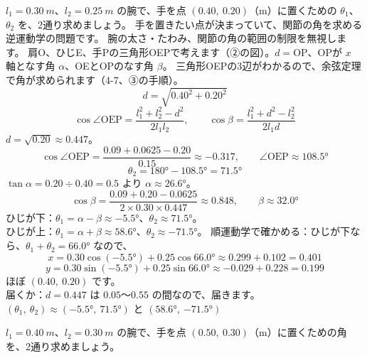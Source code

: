\begin{phreidai}\label{ph:力-7:ex6}
$l_1=\qty{0.30}{m}$、$l_2=\qty{0.25}{m}$ の腕で、手を点 $(0.40,\ 0.20)$（m）に置くための $\theta_1$、$\theta_2$ を、2通り求めましょう。
\phbamen
手を置きたい点が決まっていて、関節の角を求める逆運動学の問題です。
\phmushi
腕の太さ・たわみ、関節の角の範囲の制限を無視します。
\phzu
肩O、ひじE、手Pの三角形OEPで考えます（②の図）。$d=\mathrm{OP}$、OPが $x$ 軸となす角 $\alpha$、OEとOPのなす角 $\beta$。
\phriyu
三角形OEPの3辺がわかるので、余弦定理で角が求められます（4-7、③の手順）。
\phtateru
\[d=\sqrt{0.40^2+0.20^2}\]
\[\cos\angle\mathrm{OEP}=\frac{l_1^2+l_2^2-d^2}{2l_1l_2},\qquad \cos\beta=\frac{l_1^2+d^2-l_2^2}{2l_1d}\]
\phtoku
$d=\sqrt{0.20}\approx0.447$。
\[\cos\angle\mathrm{OEP}=\frac{0.09+0.0625-0.20}{0.15}\approx-0.317,\qquad \angle\mathrm{OEP}\approx\ang{108.5}\]
\[\theta_2=\ang{180}-\ang{108.5}=\ang{71.5}\]
$\tan\alpha=0.20\div0.40=0.5$ より $\alpha\approx\ang{26.6}$。
\[\cos\beta=\frac{0.09+0.20-0.0625}{2\times0.30\times0.447}\approx0.848,\qquad \beta\approx\ang{32.0}\]
ひじが下：$\theta_1=\alpha-\beta\approx\ang{-5.5}$、$\theta_2\approx\ang{71.5}$。\\
ひじが上：$\theta_1=\alpha+\beta\approx\ang{58.6}$、$\theta_2\approx\ang{-71.5}$。
\phtashikame
順運動学で確かめる：ひじが下なら、$\theta_1+\theta_2=\ang{66.0}$ なので、
\[x=0.30\cos(\ang{-5.5})+0.25\cos\ang{66.0}\approx0.299+0.102=0.401\]
\[y=0.30\sin(\ang{-5.5})+0.25\sin\ang{66.0}\approx-0.029+0.228=0.199\]
ほぼ $(0.40,\ 0.20)$ です。\\
届くか：$d=0.447$ は $0.05$〜$0.55$ の間なので、届きます。
\kotae $(\theta_1,\ \theta_2)\approx(\ang{-5.5},\ \ang{71.5})$ と $(\ang{58.6},\ \ang{-71.5})$
\end{phreidai}
\begin{jibun}
$l_1=\qty{0.40}{m}$、$l_2=\qty{0.30}{m}$ の腕で、手を点 $(0.50,\ 0.30)$（m）に置くための角を、2通り求めましょう。
\end{jibun}

